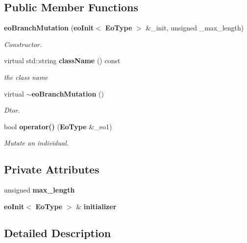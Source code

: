 \subsection*{Public Member Functions}
\begin{CompactItemize}
\item 
{\bf eo\-Branch\-Mutation} ({\bf eo\-Init}$<$ {\bf Eo\-Type} $>$ \&\_\-init, unsigned \_\-max\_\-length)
\begin{CompactList}\small\item\em Constructor. \item\end{CompactList}\item 
virtual std::string {\bf class\-Name} () const \label{classeo_branch_mutation_a1}

\begin{CompactList}\small\item\em the class name \item\end{CompactList}\item 
virtual {\bf $\sim$eo\-Branch\-Mutation} ()\label{classeo_branch_mutation_a2}

\begin{CompactList}\small\item\em Dtor. \item\end{CompactList}\item 
bool {\bf operator()} ({\bf Eo\-Type} \&\_\-eo1)
\begin{CompactList}\small\item\em Mutate an individual. \item\end{CompactList}\end{CompactItemize}
\subsection*{Private Attributes}
\begin{CompactItemize}
\item 
unsigned {\bf max\_\-length}\label{classeo_branch_mutation_r0}

\item 
{\bf eo\-Init}$<$ {\bf Eo\-Type} $>$ \& {\bf initializer}\label{classeo_branch_mutation_r1}

\end{CompactItemize}


\subsection{Detailed Description}
